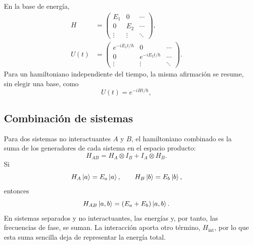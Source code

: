 En la base de energía,
\begin{equation}
\begin{aligned}
H&=
\begin{pmatrix}
E_1&0&\cdots\\
0&E_2&\cdots\\
\vdots&\vdots&\ddots
\end{pmatrix},\\[0.6em]
U(t)&=
\begin{pmatrix}
e^{-iE_1t/\hbar}&0&\cdots\\
0&e^{-iE_2t/\hbar}&\cdots\\
\vdots&\vdots&\ddots
\end{pmatrix}.
\end{aligned}
\end{equation}
Para un hamiltoniano independiente del tiempo, la misma afirmación se resume, sin elegir una base, como
\begin{equation}
\boxed{U(t)=e^{-iHt/\hbar}},
\end{equation}

\begin{classroomqa}
\end{classroomqa}

\subsection{Combinación de sistemas}

Para dos sistemas no interactuantes \(A\) y \(B\), el hamiltoniano combinado es la suma de los generadores de cada sistema en el espacio producto:
\begin{equation}
H_{AB}
=
H_A\otimes I_B+I_A\otimes H_B.
\end{equation}
Si
\begin{equation}
H_A\left\lvert a\right\rangle=E_a\left\lvert a\right\rangle,
\qquad
H_B\left\lvert b\right\rangle=E_b\left\lvert b\right\rangle,
\end{equation}
entonces
\begin{equation}
H_{AB}\left\lvert a,b\right\rangle=(E_a+E_b)\left\lvert a,b\right\rangle.
\end{equation}
En sistemas separados y no interactuantes, las energías y, por tanto, las frecuencias de fase, se suman. La interacción aporta otro término, \(H_{\mathrm{int}}\), por lo que esta suma sencilla deja de representar la energía total.


